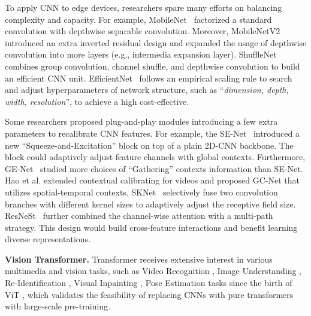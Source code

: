 \documentclass[lettersize,journal]{IEEEtran}
\begin{document}
To apply CNN to edge devices, researchers spare many efforts on balancing complexity  and capacity. For example, MobileNet~\cite{howard2017mobilenets} factorized a standard convolution with depthwise separable convolution. Moreover, MobileNetV2~\cite{Sandler2018MobileNetV2IR} introduced an extra inverted residual design and expanded the usage of depthwise convolution into more layers (e.g., intermedia expansion layer). ShuffleNet~\cite{Zhang2018ShuffleNetAE} combines group convolution, channel shuffle, and depthwise convolution to build an efficient CNN unit. EfficientNet~\cite{Tan2019EfficientNetRM} follows an empirical scaling rule to search and adjust hyperparameters of network structure, such as ``\textit{dimension, depth, width, resolution}'', to achieve a high cost-effective.


Some researchers proposed plug-and-play modules introducing a few extra parameters to recalibrate CNN features. For example, the SE-Net~\cite{Hu2018SqueezeandExcitationN} introduced a new ``Squeeze-and-Excitation'' block on top of a plain 2D-CNN backbone. The block could adaptively adjust feature channels with global contexts. Furthermore, GE-Net~\cite{Hu2018GatherExciteEF} studied more choices of ``Gathering'' contexts information than SE-Net. Hao et al. \cite{hao2022group} extended contextual calibrating for videos and proposed GC-Net that utilizes spatial-temporal contexts. SKNet~\cite{Li2019SelectiveKN} selectively fuse two convolution branches with different kernel sizes to adaptively adjust the receptive field size. ResNeSt~\cite{Zhang2020ResNeStSN} further combined
the channel-wise attention with a multi-path strategy. This design would build cross-feature interactions and benefit learning diverse representations. 

\textbf{Vision Transformer.} Transformer receives extensive interest in various multimedia and vision tasks, such as Video Recognition \cite{alfasly2022effective}, Image Understanding \cite{EAPT, YDTR}, Re-Identification \cite{Li2021ExploitingMP, Zhao2022SpatialET,zhou2022moving}, Visual Inpainting \cite{FT-TDR}, Pose Estimation \cite{Li2022ExploitingTC} tasks since the birth of ViT \cite{dosovitskiy2021an}, which validates the feasibility of replacing CNNs with pure transformers with large-scale pre-training. 
\end{document}
